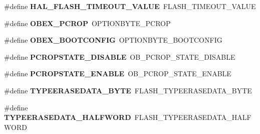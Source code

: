 \begin{DoxyCompactItemize}
\item 
\mbox{\label{group___h_a_l___f_l_a_s_h___aliased___defines_ga0c295495be438d4092e29488ac3ee897}} 
\#define {\bfseries H\+A\+L\+\_\+\+F\+L\+A\+S\+H\+\_\+\+T\+I\+M\+E\+O\+U\+T\+\_\+\+V\+A\+L\+UE}~F\+L\+A\+S\+H\+\_\+\+T\+I\+M\+E\+O\+U\+T\+\_\+\+V\+A\+L\+UE
\item 
\mbox{\label{group___h_a_l___f_l_a_s_h___aliased___defines_ga1de788f8cf04b70320aaebf3388e638c}} 
\#define {\bfseries O\+B\+E\+X\+\_\+\+P\+C\+R\+OP}~O\+P\+T\+I\+O\+N\+B\+Y\+T\+E\+\_\+\+P\+C\+R\+OP
\item 
\mbox{\label{group___h_a_l___f_l_a_s_h___aliased___defines_ga79284d41c929869394172fc526ff3d7e}} 
\#define {\bfseries O\+B\+E\+X\+\_\+\+B\+O\+O\+T\+C\+O\+N\+F\+IG}~O\+P\+T\+I\+O\+N\+B\+Y\+T\+E\+\_\+\+B\+O\+O\+T\+C\+O\+N\+F\+IG
\item 
\mbox{\label{group___h_a_l___f_l_a_s_h___aliased___defines_ga09f7800119c1971e339df62f11beab14}} 
\#define {\bfseries P\+C\+R\+O\+P\+S\+T\+A\+T\+E\+\_\+\+D\+I\+S\+A\+B\+LE}~O\+B\+\_\+\+P\+C\+R\+O\+P\+\_\+\+S\+T\+A\+T\+E\+\_\+\+D\+I\+S\+A\+B\+LE
\item 
\mbox{\label{group___h_a_l___f_l_a_s_h___aliased___defines_ga9e086afe58f178c3e86526666bedc217}} 
\#define {\bfseries P\+C\+R\+O\+P\+S\+T\+A\+T\+E\+\_\+\+E\+N\+A\+B\+LE}~O\+B\+\_\+\+P\+C\+R\+O\+P\+\_\+\+S\+T\+A\+T\+E\+\_\+\+E\+N\+A\+B\+LE
\item 
\mbox{\label{group___h_a_l___f_l_a_s_h___aliased___defines_ga4b3d9b5629b76e57da896b4b7f95d3d7}} 
\#define {\bfseries T\+Y\+P\+E\+E\+R\+A\+S\+E\+D\+A\+T\+A\+\_\+\+B\+Y\+TE}~F\+L\+A\+S\+H\+\_\+\+T\+Y\+P\+E\+E\+R\+A\+S\+E\+D\+A\+T\+A\+\_\+\+B\+Y\+TE
\item 
\mbox{\label{group___h_a_l___f_l_a_s_h___aliased___defines_gaaad85877529e61a7d77a294a9cf2d474}} 
\#define {\bfseries T\+Y\+P\+E\+E\+R\+A\+S\+E\+D\+A\+T\+A\+\_\+\+H\+A\+L\+F\+W\+O\+RD}~F\+L\+A\+S\+H\+\_\+\+T\+Y\+P\+E\+E\+R\+A\+S\+E\+D\+A\+T\+A\+\_\+\+H\+A\+L\+F\+W\+O\+RD

\end{DoxyCompactItemize}
